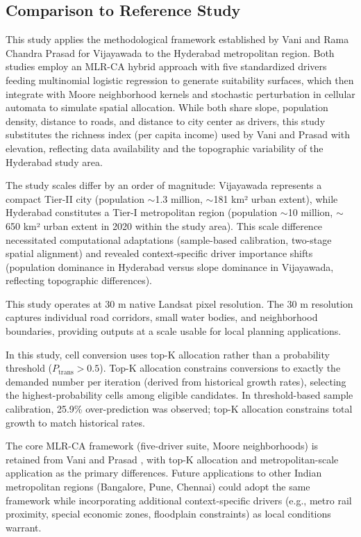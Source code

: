 \documentclass[12pt,a4paper]{article}
\begin{document}
\subsection{Comparison to Reference Study}

This study applies the methodological framework established by Vani and Rama Chandra Prasad \cite{vani2022} for Vijayawada to the Hyderabad metropolitan region. Both studies employ an MLR-CA hybrid approach with five standardized drivers feeding multinomial logistic regression to generate suitability surfaces, which then integrate with Moore neighborhood kernels and stochastic perturbation in cellular automata to simulate spatial allocation. While both share slope, population density, distance to roads, and distance to city center as drivers, this study substitutes the richness index (per capita income) used by Vani and Prasad with elevation, reflecting data availability and the topographic variability of the Hyderabad study area.

The study scales differ by an order of magnitude: Vijayawada represents a compact Tier-II city (population $\sim$1.3 million, $\sim$181 km² urban extent), while Hyderabad constitutes a Tier-I metropolitan region (population $\sim$10 million, $\sim$650 km² urban extent in 2020 within the study area). This scale difference necessitated computational adaptations (sample-based calibration, two-stage spatial alignment) and revealed context-specific driver importance shifts (population dominance in Hyderabad versus slope dominance in Vijayawada, reflecting topographic differences).

This study operates at 30 m native Landsat pixel resolution. The 30 m resolution captures individual road corridors, small water bodies, and neighborhood boundaries, providing outputs at a scale usable for local planning applications.

In this study, cell conversion uses top-K allocation rather than a probability threshold ($P_{\text{trans}} > 0.5$). Top-K allocation constrains conversions to exactly the demanded number per iteration (derived from historical growth rates), selecting the highest-probability cells among eligible candidates. In threshold-based sample calibration, 25.9\% over-prediction was observed; top-K allocation constrains total growth to match historical rates.

The core MLR-CA framework (five-driver suite, Moore neighborhoods) is retained from Vani and Prasad \cite{vani2022}, with top-K allocation and metropolitan-scale application as the primary differences. Future applications to other Indian metropolitan regions (Bangalore, Pune, Chennai) could adopt the same framework while incorporating additional context-specific drivers (e.g., metro rail proximity, special economic zones, floodplain constraints) as local conditions warrant.
\end{document}
